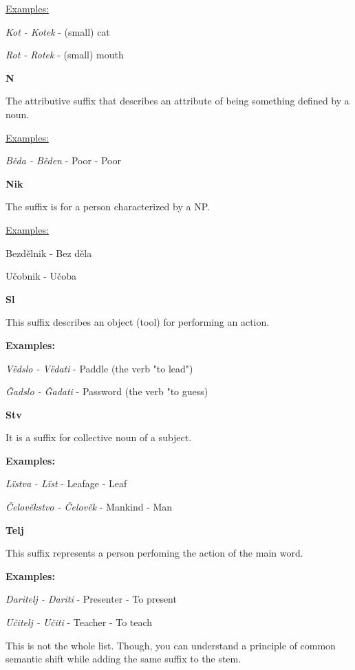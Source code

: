 \underline{Examples:}

\textit{Kot - Kotek} - (small) cat

\textit{Rot - Rotek} - (small) mouth

\textbf{N}

The attributive suffix that describes an attribute of being something defined by a noun.

\underline{Examples:}

\textit{Běda - Běden} - Poor - Poor

\textbf{Nik}

The suffix is for a person characterized by a NP.

\underline{Examples:}

Bezdělnik - Bez děla

Učobnik - Učoba

\textbf{Sl}

This suffix describes an object (tool) for performing an action.

\textbf{Examples:}

\textit{Vëdslo - Vëdati} - Paddle (the verb "to lead")

\textit{Ĝadslo - Ĝadati} - Password (the verb "to guess)

\textbf{Stv}

It is a suffix for collective noun of a subject.

\textbf{Examples:}

\textit{Lïstva - Lïst} - Leafage - Leaf

\textit{Čelověkstvo - Čelověk} - Mankind - Man

\textbf{Telj}

This suffix represents a person perfoming the action of the main word.

\textbf{Examples:}

\textit{Daritelj - Dariti} - Presenter - To present

\textit{Učitelj - Učiti} - Teacher - To teach

This is not the whole list. Though, you can understand a principle of common semantic shift while adding the same suffix to the stem.
